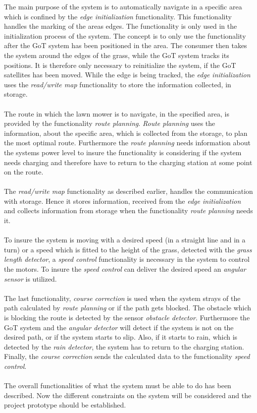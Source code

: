\noindent
The main purpose of the system is to automatically navigate in a specific area which is confined by the \textit{edge initialization} functionality. This functionality handles the marking of the areas edges. The functionality is only used in the initialization process of the system. The concept is to only use the functionality after the GoT system has been positioned in the area. The consumer then takes the system around the edges of the grass, while the GoT system tracks its positions. It is therefore only necessary to reinitialize the system, if the GoT satellites has been moved. While the edge is being tracked, the \textit{edge initialization} uses the \textit{read/write map} functionality to store the information collected, in storage. \\\\ 
\noindent
The route in which the lawn mower is to navigate, in the specified area, is provided by the functionality \textit{route planning}. \textit{Route planning} uses the information, about the specific area, which is collected from the storage, to plan the most optimal route. Furthermore the \textit{route planning} needs information about the systems power level to insure the functionality is considering if the system needs charging and therefore have to return to the charging station at some point on the route.\\\\
\noindent
The \textit{read/write map} functionality as described earlier, handles the communication with storage. Hence it stores information, received from the \textit{edge initialization} and collects information from storage when the functionality \textit{route planning} needs it. \\\\
\noindent
To insure the system is moving with a desired speed (in a straight line and in a turn) or a speed which is fitted to the height of the grass, detected with the \textit{grass length detector}, a \textit{speed control} functionality is necessary in the system to control the motors. To insure the \textit{speed control} can deliver the desired speed an \textit{angular sensor} is utilized. \\\\
\noindent
The last functionality, \textit{course correction} is used when the system strays of the path calculated by \textit{route planning} or if the path gets blocked.
The obstacle which is blocking the route is detected by the sensor \textit{obstacle detector}. Furthermore the GoT system and the \textit{angular detector} will detect if the system is not on the desired path, or if the system starts to slip. Also, if it starts to rain, which is detected by the \textit{rain detector}, the system has to return to the charging station.
Finally, the \textit{course correction} sends the calculated data to the functionality \textit{speed control}. \\\\
\noindent
The overall functionalities of what the system must be able to do has been described. Now the different constraints on the system will be considered and the project prototype should be established.